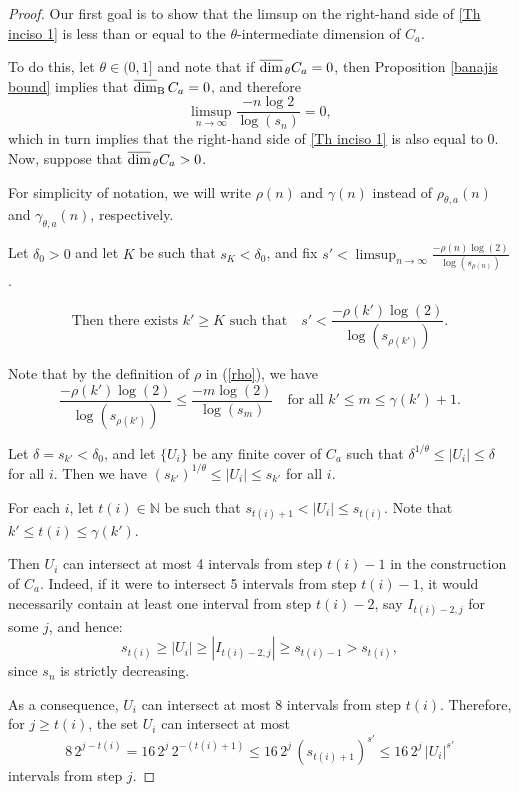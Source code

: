 \documentclass[11pt,reqno,bookmarksnumbered,raiselinks,breaklinks,colorlinks,plainpages]{amsart}
\newcommand\ubd{\overline{\mbox{\rm dim}}_{\rm B}\,} %
\newcommand\uda{\overline{\mbox{\rm dim}}_{\,\theta}} %
\begin{document}
\begin{proof}
  Our first goal is to show that the limsup on the right-hand side of \eqref{Th inciso 1} is less than or equal to the $\theta$-intermediate dimension of $C_a$.

To do this, let $\theta\in(0,1]$ and note that if $\uda C_a = 0$, then Proposition \ref{banajis bound} implies that $\ubd C_a = 0$, and therefore
\[
\limsup_{n \to \infty} \frac{-n \log 2}{\log(s_n)} = 0,
\]
which in turn implies that the right-hand side of \eqref{Th inciso 1} is also equal to $0$.
Now, suppose that $\uda C_a > 0$.

For simplicity of notation, we will write \( \rho(n) \) and \( \gamma(n) \) instead of \( \rho_{\theta,a}(n) \) and \( \gamma_{\theta,a}(n) \), respectively.


Let $\delta_0 > 0$ and let $K$ be such that $s_K < \delta_0$, and fix $s' < \displaystyle\limsup_{n \rightarrow \infty} \frac{-\rho(n)\log(2)}{\log(s_{\rho(n)})}$.

\begin{equation}\label{s'}\text{Then there exists $k' \geq K$ such that}\quad   
s' < \frac{ -\rho(k')\log(2)}{\log(s_{\rho(k')})} .
\end{equation}

Note that by the definition of $\rho$ in (\ref{rho}), we have
\[
\frac{-\rho (k') \log (2)}{\log ( s_{\rho (k')} )} \leq \frac{-m \log (2)}{\log ( s_{m} )}\quad \text{for all $k' \leq m \leq \gamma(k') + 1$}.
\]



Let $\delta = s_{k'} < \delta_0$, and let $\{U_i\}$ be any finite cover of $C_a$ such that $\delta^{1/\theta} \leq |U_i| \leq \delta$ for all $i$. Then we have $(s_{k'})^{1/\theta} \leq |U_i| \leq s_{k'}$ for all $i$.

For each $i$, let $t(i) \in \mathbb{N}$ be such that $s_{t(i)+1} < |U_i| \leq s_{t(i)}$. Note that $k' \leq t(i) \leq \gamma(k')$.

Then $U_i$ can intersect at most 4 intervals from step $t(i)-1$ in the construction of $C_a$. Indeed, if it were to intersect 5 intervals from step $t(i)-1$, it would necessarily contain at least one interval from step $t(i)-2$, say $I_{t(i)-2,j}$ for some $j$, and hence:
\[
s_{t(i)} \geq |U_i| \geq |I_{t(i)-2,j}| \geq s_{t(i)-1} > s_{t(i)},
\]
since $s_n$ is strictly decreasing.

As a consequence, $U_i$ can intersect at most 8 intervals from step $t(i)$. Therefore, for $j \geq t(i)$, the set $U_i$ can intersect at most
\[
8 \, 2^{j-t(i)} = 16 \, 2^j \, 2^{-(t(i)+1)} \leq 16 \, 2^j \, (s_{t(i)+1})^{s'} \leq 16 \, 2^j \, |U_i|^{s'}
\]
intervals from step $j$.


\end{proof}
\end{document}
